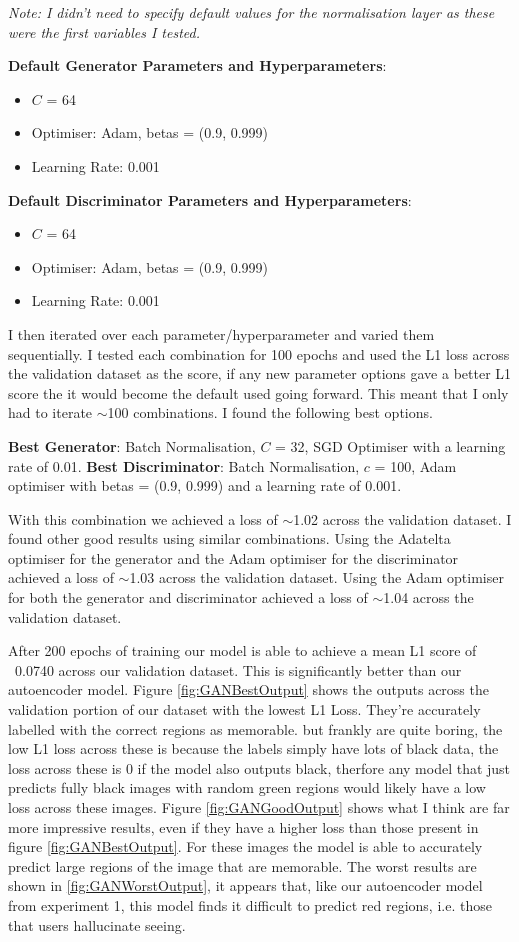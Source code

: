 \documentclass{UoYCSproject}
\begin{document}
\emph{Note: I didn't need to specify default values for the normalisation layer as these were the first variables I tested.}

\textbf{Default Generator Parameters and Hyperparameters}: 
\begin{itemize}
\item $C$ = 64
\item Optimiser: Adam, betas = (0.9, 0.999)
\item Learning Rate: 0.001
\end{itemize}
\textbf{Default Discriminator Parameters and Hyperparameters}:
\begin{itemize}
\item $C$ = 64
\item Optimiser: Adam, betas = (0.9, 0.999)
\item Learning Rate: 0.001
\end{itemize}
I then iterated over each parameter/hyperparameter and varied them sequentially. I tested each combination for 100 epochs and used the L1 loss across the validation dataset as the score, if any new parameter options gave a better L1 score the it would become the default used going forward. This meant that I only had to iterate \(\sim\)100 combinations. I found the following best options.

\textbf{Best Generator}: Batch Normalisation, $C$ = 32, SGD Optimiser with a learning rate of 0.01.
\textbf{Best Discriminator}: Batch Normalisation, $c$ = 100, Adam optimiser with betas = (0.9, 0.999) and a learning rate of 0.001.

With this combination we achieved a loss of \(\sim\)1.02 across the validation dataset. I found other good results using similar combinations. Using the Adatelta optimiser for the generator and the Adam optimiser for the discriminator achieved a loss of \(\sim\)1.03 across the validation dataset. Using the Adam optimiser for both the generator and discriminator achieved a loss of \(\sim\)1.04 across the validation dataset.


After 200 epochs of training our model is able to achieve a mean L1 score of ~0.0740 across our validation dataset. This is significantly better than our autoencoder model. 
Figure \ref{fig:GANBestOutput} shows the outputs across the validation portion of our dataset with the lowest L1 Loss. They're accurately labelled with the correct regions as memorable. 
but frankly are quite boring, the low L1 loss across these is because the labels simply have lots of black data, the loss across these is 0 if the model also outputs black, therfore any model that just predicts fully black images with random green regions would likely have a low loss across these images. 
Figure \ref{fig:GANGoodOutput} shows what I think are far more impressive results, even if they have a higher loss than those present in figure \ref{fig:GANBestOutput}. For these images the model is able to accurately predict large regions of the image that are memorable.
The worst results are shown in \ref{fig:GANWorstOutput}, it appears that, like our autoencoder model from experiment 1, this model finds it difficult to predict red regions, i.e. those that users hallucinate seeing.
\end{document}
